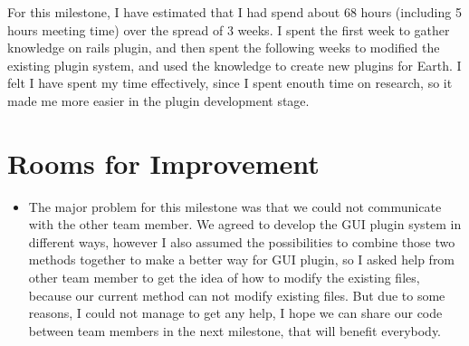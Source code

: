 \documentclass{article}
\begin{document}
For this milestone, I have estimated that I had spend about 68 hours (including 5 hours meeting time) over the spread of 3 weeks. I spent the first week to gather knowledge on rails plugin, and then spent the following weeks to modified the existing plugin system, and used the knowledge to create new plugins for Earth. I felt I have spent my time effectively, since I spent enouth time on research, so it made me more easier in the plugin development stage. 

\section*{Rooms for Improvement}

\begin{itemize}
   \item The major problem for this milestone was that we could not communicate with the other team member. We agreed to develop the GUI plugin system in different ways, however I also assumed the possibilities to combine those two methods together to make a better way for GUI plugin, so I asked help from other team member to get the idea of how to modify the existing files, because our current method can not modify existing files. But due to some reasons, I could not manage to get any help, I hope we can share our code between team members in the next milestone, that will benefit everybody.
\end{itemize}
\end{document}
